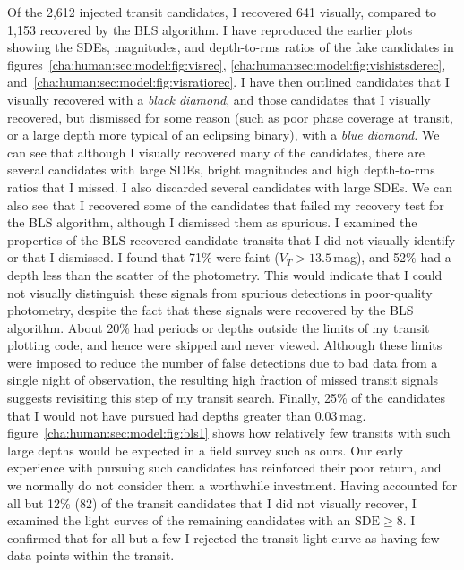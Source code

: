 Of the 2,612 injected transit candidates, I recovered 641 visually, compared to 1,153 recovered by the BLS algorithm.
I have reproduced the earlier plots showing the SDEs, magnitudes, and depth-to-rms ratios of the fake candidates in figures~\ref{cha:human:sec:model:fig:visrec}, \ref{cha:human:sec:model:fig:vishistsderec}, and~\ref{cha:human:sec:model:fig:visratiorec}. I have then outlined candidates that I visually recovered with a {\it black diamond}, and those candidates that I visually recovered, but dismissed for some reason (such as poor phase coverage at transit, or a large depth more typical of an eclipsing binary), with a {\it blue diamond.}
We can see that although I visually recovered many of the candidates, there are several candidates with large SDEs, bright magnitudes and high depth-to-rms ratios that I missed.
I also discarded several candidates with large SDEs.
We can also see that I recovered some of the candidates that failed my recovery test for the BLS algorithm, although I dismissed them as spurious.
I examined the properties of the BLS-recovered candidate transits that I did not visually identify or that I dismissed.
I found that 71\% were faint ($V_{T}>13.5$\,mag), and 52\% had a depth less than the scatter of the photometry.
This would indicate that I could not visually distinguish these signals from spurious detections in poor-quality photometry, despite the fact that these signals were recovered by the BLS algorithm.
About 20\% had periods or depths outside the limits of my transit plotting code, and hence were skipped and never viewed.
Although these limits were imposed to reduce the number of false detections due to bad data from a single night of observation, the resulting high fraction of missed transit signals suggests revisiting this step of my transit search.
Finally, 25\% of the candidates that I would not have pursued had depths greater than 0.03\,mag.
figure~\ref{cha:human:sec:model:fig:bls1} %
shows how relatively few transits with such large depths would be expected in a field survey such as ours.
Our early experience with pursuing such candidates has reinforced their poor return, and we normally do not consider them a worthwhile investment.
Having accounted for all but 12\% (82) of the transit candidates that I did not visually recover, I examined the light curves of the remaining candidates with an $\mathrm{SDE}\geq8$.
I confirmed that for all but a few I rejected the transit light curve as having few data points within the transit.


